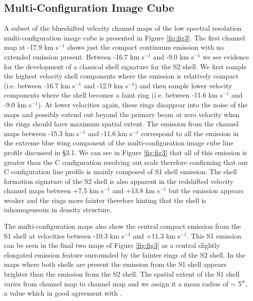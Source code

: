 \documentclass[preprint2]{aastex}
\begin{document}
\subsection{Multi-Configuration Image Cube} \label{results2} 

A subset of the blueshifted velocity channel maps of the low spectral resolution multi-configuration image cube is presented in Figure \ref{fig:fig3}. The first channel map at -17.9 km s${}^{-1}$ shows just the compact continuum emission with no extended emission present. Between -16.7 km s${}^{-1}$ and -9.0 km s${}^{-1}$ we see evidence for the development of a classical shell signature for the S2 shell. We first sample the highest velocity shell components where the emission is relatively compact (i.e. between -16.7 km s${}^{-1}$ and -12.9 km s${}^{-1}$) and then sample lower velocity components where the shell becomes a faint ring (i.e. between -11.6 km s${}^{-1}$ and -9.0 km s${}^{-1}$). At lower velocities again, these rings disappear into the noise of the maps and possibly extend out beyond the primary beam at zero velocity when the rings should have maximum spatial extent. The emission from the channel maps between -15.3 km s${}^{-1}$ and -11.6 km s${}^{-1}$ correspond to all the emission in the extreme blue wing component of the multi-configuration image cube line profile discussed in \S3.1. We can see in Figure \ref{fig:fig3} that all of this emission is greater than the C configuration resolving out scale therefore confirming that our C configuration line profile is mainly composed of S1 shell emission. The shell formation signature of the S2 shell is also apparent in the redshifted velocity channel maps between +7.5 km s${}^{-1}$ and +13.8 km s${}^{-1}$ but the emission appears weaker and the rings more fainter therefore hinting that the shell is inhomogeneous in density structure. 

The multi-configuration maps also show the central compact emission from the S1 shell at velocities between -10.3 km s${}^{-1}$ and +11.3 km s${}^{-1}$. This S1 emission can be seen in the final two maps of Figure \ref{fig:fig3} as a central slightly elongated emission feature surrounded by the fainter rings of the S2 shell. In the maps where both shells are present the emission from the S1 shell appears brighter than the emission from the S2 shell. The spatial extent of the S1 shell varies from channel map to channel map and we assign it a mean radius of $\sim$ 5$\mbox{$^{\prime\prime}$}$, a value which in good agreement with \cite{2009AJ....137.3558S}. 
\end{document}
